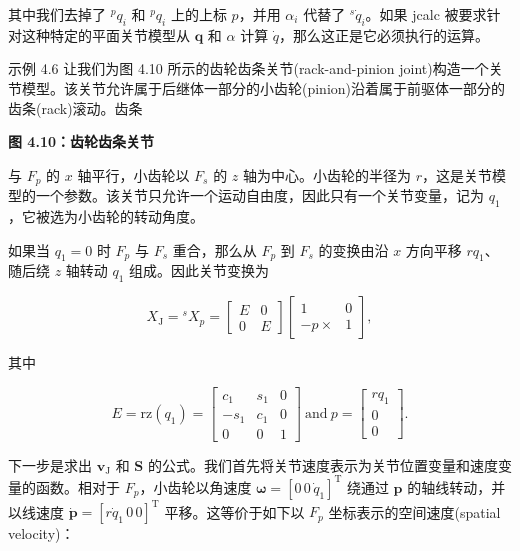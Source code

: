 \documentclass[10pt,a4paper]{book}
\theoremstyle{thmstyle} %
\theoremstyle{defstyle} %
\theoremstyle{prostyle} %
\begin{document}
其中我们去掉了 ${}^{p}q_{i}$ 和 ${}^{p}q_{i}$ 上的上标 $p$，并用 $\alpha_{i}$ 代替了 ${}^{s}\dot{q}_{i}$。如果 jcalc 被要求针对这种特定的平面关节模型从 $\mathbf{q}$ 和 $\alpha$ 计算 $\dot{q}$，那么这正是它必须执行的运算。



示例 4.6 让我们为图 4.10 所示的齿轮齿条关节(rack-and-pinion joint)构造一个关节模型。该关节允许属于后继体一部分的小齿轮(pinion)沿着属于前驱体一部分的齿条(rack)滚动。齿条



\noindent\textbf{图 4.10：齿轮齿条关节}





与 $F_{p}$ 的 $x$ 轴平行，小齿轮以 $F_{s}$ 的 $z$ 轴为中心。小齿轮的半径为 $r$，这是关节模型的一个参数。该关节只允许一个运动自由度，因此只有一个关节变量，记为 $q_{1}$，它被选为小齿轮的转动角度。



如果当 $q_{1}=0$ 时 $F_{p}$ 与 $F_{s}$ 重合，那么从 $F_{p}$ 到 $F_{s}$ 的变换由沿 $x$ 方向平移 $rq_{1}$、随后绕 $z$ 轴转动 $q_{1}$ 组成。因此关节变换为



$$
X _ { \mathrm { J } } = { } ^{s} X _ { p } = { \left[ \begin{array}{ll} { E } & { 0 } \\{ 0 } & { E } \end{array} \right] } { \left[ \begin{array}{ll} { 1 } & { 0 } \\{ - p \times } & { 1 } \end{array} \right] } ,
$$



其中



$$
E = \mathrm { r z } ( q _ { 1 } ) = \left[ \begin{array}{lll} { c _ { 1 } } & { s _ { 1 } } & { 0 } \\{ - s _ { 1 } } & { c _ { 1 } } & { 0 } \\{ 0 } & { 0 } & { 1 } \end{array} \right]  \mathrm { ~ a n d ~ }  p = \left[ \begin{array}{l} { r q _ { 1 } } \\{ 0 } \\{ 0 } \end{array} \right] .
$$



下一步是求出 $\boldsymbol{v}_{\mathrm{J}}$ 和 $\boldsymbol{S}$ 的公式。我们首先将关节速度表示为关节位置变量和速度变量的函数。相对于 $F_{p}$，小齿轮以角速度 $\boldsymbol{\omega}=[0\,0\,\dot{q}_{1}]^{\mathrm{T}}$ 绕通过 $\boldsymbol{p}$ 的轴线转动，并以线速度 $\dot{\boldsymbol{p}}=[r\dot{q}_{1}\,0\,0]^{\mathrm{T}}$ 平移。这等价于如下以 $F_{p}$ 坐标表示的空间速度(spatial velocity)：
\end{document}
